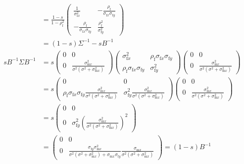 \documentclass{article}
\newcommand{\x}[1]{\text{#1}}
\begin{document}
\begin{landscape}
\begin{align*}
\\&=\frac{1-s}{1-\rho_\x{f}^2}\left(\begin{array}{cc} \frac{1}{\sigma_{\x{f}x}^2} & -\frac{\rho_\x{f}}{\sigma_{\x{f}x}\sigma_{\x{f}y}} \\ -\frac{\rho_\x{f}}{\sigma_{\x{f}x}\sigma_{\x{f}y}} & \frac{\rho_\x{f}^2}{\sigma_{\x{f}y}^2}\end{array}\right)
\\&=(1-s)\Sigma^{-1}-sB^{-1}
\\ sB^{-1}\Sigma B^{-1}&=s\left(\begin{array}{cc} 0 & 0 \\ 0 & \frac{\sigma_{\x{m}x}^2}{\sigma^2(\sigma^2+\sigma_{\x{m}x}^2)} \end{array}\right)\left(\begin{array}{cc}\sigma_{\x{f}x}^2 & \rho_\x{f}\sigma_{\x{f}x}\sigma_{\x{f}y} \\ \rho_\x{f}\sigma_{\x{f}x}\sigma_{\x{f}y} & \sigma_{\x{f}y}^2 \end{array}\right)\left(\begin{array}{cc} 0 & 0 \\ 0 & \frac{\sigma_{\x{m}x}^2}{\sigma^2(\sigma^2+\sigma_{\x{m}x}^2)} \end{array}\right)
\\&=s\left(\begin{array}{cc}0 & 0 \\ \rho_\x{f}\sigma_{\x{f}x}\sigma_{\x{f}y}\frac{\sigma_{\x{m}x}^2}{\sigma^2(\sigma^2+\sigma_{\x{m}x}^2)} & \sigma_{\x{f}y}^2\frac{\sigma_{\x{m}x}^2}{\sigma^2(\sigma^2+\sigma_{\x{m}x}^2)} \end{array}\right)\left(\begin{array}{cc} 0 & 0 \\ 0 & \frac{\sigma_{\x{m}x}^2}{\sigma^2(\sigma^2+\sigma_{\x{m}x}^2)} \end{array}\right)
\\&=s\left(\begin{array}{cc} 0 & 0 \\ 0 & \sigma_{\x{f}y}^2\left(\frac{\sigma_{\x{m}x}^2}{\sigma^2(\sigma^2+\sigma_{\x{m}x}^2)}\right)^2\end{array}\right)
\\&=\left(\begin{array}{cc} 0 & 0 \\ 0 & \frac{\sigma_{\x{f}y}\sigma_{\x{m}x}^2}{\sigma^2(\sigma^2+\sigma_{\x{m}x}^2)+\sigma_{\x{m}x}\sigma_{\x{f}y}}\frac{\sigma_{\x{m}x}}{\sigma^2(\sigma^2+\sigma_{\x{m}x}^2)}\end{array}\right)=(1-s)B^{-1}

\end{align*}
\end{landscape}
\end{document}
